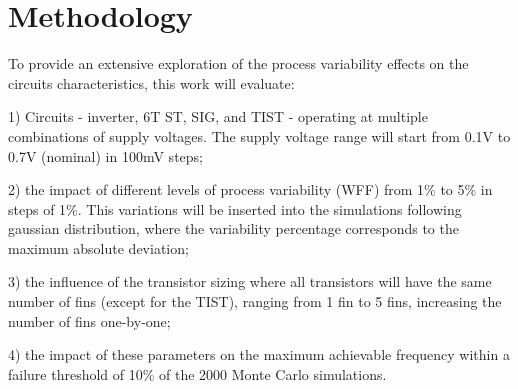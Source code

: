 \documentclass[pgmicro,mestrado,english]{iiufrgs}
\begin{document}


\chapter{Methodology}

To provide an extensive exploration of the process variability effects on the circuits characteristics, this work will evaluate:

1) Circuits - inverter, 6T ST, SIG, and TIST - operating at multiple combinations of supply voltages. The supply voltage range will start from 0.1V to 0.7V (nominal) in 100mV steps;

 2) the impact of different levels of process variability (WFF) from 1\% to 5\% in steps of 1\%. This variations will be inserted into the simulations following gaussian distribution, where the variability percentage corresponds to the maximum absolute deviation;

 3) the influence of the transistor sizing where all transistors will have the same number of fins (except for the TIST), ranging from 1 fin to 5 fins, increasing the number of fins one-by-one;

4) the impact of these parameters on the maximum achievable frequency within a failure threshold of 10\% of the 2000 Monte Carlo simulations.
\end{document}
